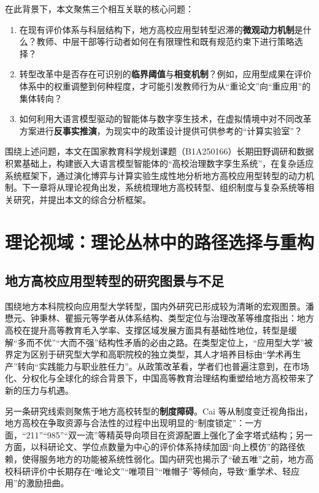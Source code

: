 \documentclass[UTF8, zihao=-4, fontset=mac]{ctexart}
\begin{document}
在此背景下，本文聚焦三个相互关联的核心问题：

\begin{enumerate}
    \item 在现有评价体系与科层结构下，地方高校应用型转型迟滞的\textbf{微观动力机制}是什么？教师、中层干部等行动者如何在有限理性和既有规范约束下进行策略选择？
    \item 转型改革中是否存在可识别的\textbf{临界阈值}与\textbf{相变机制}？例如，应用型成果在评价体系中的权重调整到何种程度，才可能引发教师行为从“重论文”向“重应用”的集体转向？
    \item 如何利用大语言模型驱动的智能体与数字孪生技术，在虚拟情境中对不同改革方案进行\textbf{反事实推演}，为现实中的政策设计提供可供参考的“计算实验室”？
\end{enumerate}

围绕上述问题，本文在国家教育科学规划课题（B1A250166）长期田野调研和数据积累基础上，构建嵌入大语言模型智能体的“高校治理数字孪生系统”，在复杂适应系统框架下，通过演化博弈与计算实验生成性地分析地方高校应用型转型的动力机制。下一章将从理论视角出发，系统梳理地方高校转型、组织制度与复杂系统等相关研究，并提出本文的综合分析框架。

\section{理论视域：理论丛林中的路径选择与重构}

\subsection{地方高校应用型转型的研究图景与不足}

围绕地方本科院校向应用型大学转型，国内外研究已形成较为清晰的宏观图景。潘懋元、钟秉林、瞿振元等学者从体系结构、类型定位与治理改革等维度指出：地方高校在提升高等教育毛入学率、支撑区域发展方面具有基础性地位，转型是缓解“多而不优”“大而不强”结构性矛盾的必由之路\cite{pan2014transformation, zha2011understanding}。在类型定位上，“应用型大学”被界定为区别于研究型大学和高职院校的独立类型，其人才培养目标由“学术再生产”转向“实践能力与职业胜任力”\cite{qu2014connotation}。从政策改革看，学者们也普遍注意到，在市场化、分权化与全球化的综合背景下，中国高等教育治理结构重塑给地方高校带来了新的压力与机遇\cite{mok2005globalization}。

另一条研究线索则聚焦于地方高校转型的\textbf{制度障碍}。Cai 等从制度变迁视角指出，地方高校在争取资源与合法性的过程中出现明显的“制度锁定”：一方面，“211”“985”“双一流”等精英导向项目在资源配置上强化了金字塔式结构；另一方面，以科研论文、学位点数量为中心的评价体系持续加固“向上模仿”的路径依赖，使得服务地方的功能被系统性弱化\cite{cai2014institutional}。国内研究也揭示了“破五唯”之前，地方高校科研评价中长期存在“唯论文”“唯项目”“唯帽子”等倾向，导致“重学术、轻应用”的激励扭曲\cite{wu2019evaluation}。
\end{document}
